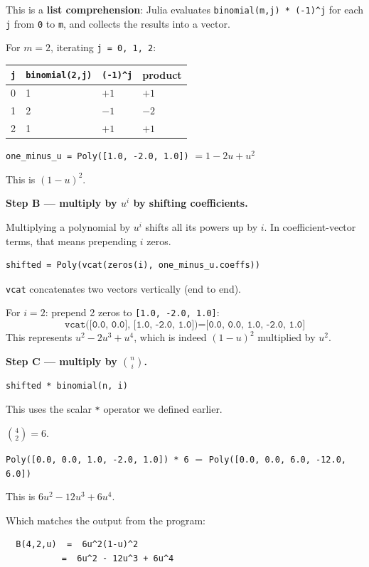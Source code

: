 \documentclass[12pt, a4paper]{article}
\newcommand{\cd}[1]{\texttt{#1}}
\begin{document}
This is a \textbf{list comprehension}: Julia evaluates
\cd{binomial(m,j) * (-1)\^{}j} for each \cd{j} from \cd{0} to \cd{m},
and collects the results into a vector.

\begin{examplebox}
For $m = 2$, iterating \cd{j = 0, 1, 2}:

\medskip
\begin{tabular}{llll}
\toprule
\cd{j} & \cd{binomial(2,j)} & \cd{(-1)\^{}j} & product \\
\midrule
0 & 1 & $+1$ & $+1$ \\
1 & 2 & $-1$ & $-2$ \\
2 & 1 & $+1$ & $+1$ \\
\bottomrule
\end{tabular}

\medskip
\cd{one\_minus\_u = Poly([1.0, -2.0, 1.0])} $= 1 - 2u + u^2$

This is $(1-u)^2$. \checkmark
\end{examplebox}

\textbf{Step B --- multiply by $u^i$ by shifting coefficients.}

Multiplying a polynomial by $u^i$ shifts all its powers up by $i$.
In coefficient-vector terms, that means prepending $i$ zeros.

\begin{verbatim}
shifted = Poly(vcat(zeros(i), one_minus_u.coeffs))
\end{verbatim}

\cd{vcat} concatenates two vectors vertically (end to end).

\begin{examplebox}
For $i = 2$: prepend 2 zeros to \cd{[1.0, -2.0, 1.0]}:
\[
  \cd{vcat([0.0, 0.0], [1.0, -2.0, 1.0])}
  = \cd{[0.0, 0.0, 1.0, -2.0, 1.0]}
\]
This represents $u^2 - 2u^3 + u^4$,
which is indeed $(1-u)^2$ multiplied by $u^2$. \checkmark
\end{examplebox}

\textbf{Step C --- multiply by $\binom{n}{i}$.}

\begin{verbatim}
shifted * binomial(n, i)
\end{verbatim}

This uses the scalar \cd{*} operator we defined earlier.

\begin{examplebox}
$\binom{4}{2} = 6$.

\cd{Poly([0.0, 0.0, 1.0, -2.0, 1.0]) * 6}
$= $ \cd{Poly([0.0, 0.0, 6.0, -12.0, 6.0])}

This is $6u^2 - 12u^3 + 6u^4$.

Which matches the output from the program:
\begin{verbatim}
  B(4,2,u)  =  6u^2(1-u)^2
           =  6u^2 - 12u^3 + 6u^4
\end{verbatim}
\checkmark
\end{examplebox}
\end{document}
